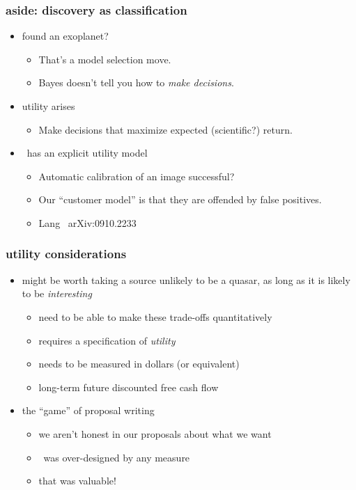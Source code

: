 \documentclass[pdftex]{beamer}
\begin{document}
\begin{frame}
  \frametitle{aside: discovery as classification}
  \begin{itemize}
  \item found an exoplanet?
    \begin{itemize}
    \item That's a model selection move.
    \item Bayes doesn't tell you how to \emph{make decisions}.
    \end{itemize}
  \item utility arises
    \begin{itemize}
    \item Make decisions that maximize expected (scientific?) return.
    \end{itemize}
  \item \an\ has an explicit utility model
    \begin{itemize}
    \item Automatic calibration of an image successful?
    \item Our ``customer model'' is that they are offended by false positives.
    \item Lang \etal\ arXiv:0910.2233
    \end{itemize}
  \end{itemize}
\end{frame}

\begin{frame}
  \frametitle{utility considerations}
  \begin{itemize}
  \item might be worth taking a source unlikely to be a quasar, as long as it is likely to be \emph{interesting}
    \begin{itemize}
    \item need to be able to make these trade-offs quantitatively
    \item requires a specification of \emph{utility}
    \item needs to be measured in dollars (or equivalent)
    \item long-term future discounted free cash flow
    \end{itemize}
  \item the ``game'' of proposal writing
    \begin{itemize}
    \item we aren't honest in our proposals about what we want
    \item \sdss\ was over-designed by any measure
    \item that was valuable!
    \end{itemize}
  \end{itemize}
\end{frame}
\end{document}
